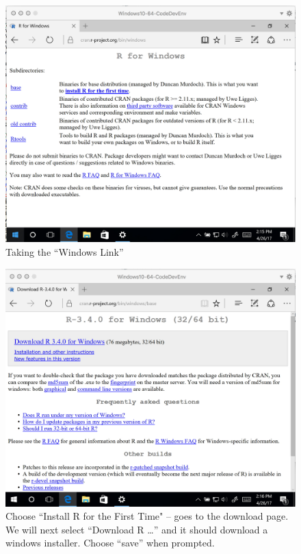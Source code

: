 \begin{figure}[h!] %
   \centering
   \includegraphics[width=4.5in]{./1-Introduction/gnuRproject.jpg} 
   \caption{Taking the ``Windows Link''}
\end{figure}

\begin{figure}[h!] %
   \centering
   \includegraphics[width=4.5in]{./1-Introduction/downloadR.jpg} 
   \caption{Choose ``Install R for the First Time" -- goes to the download page.  We will next select ``Download R \dots'' and it should download a windows installer.  Choose ``save'' when prompted.}
\end{figure}

